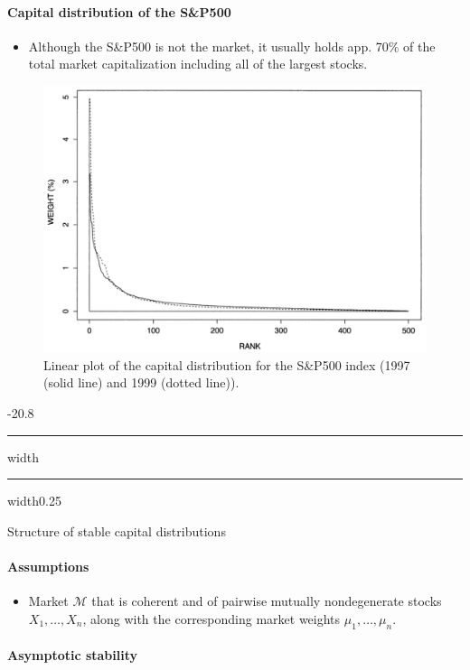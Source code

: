 \documentclass[a4paper,landscape,8pt,fleqn]{scrartcl}
\makeatletter
\renewcommand{\subsection}{\@startsection{subsection}{1}{0mm}%
{-2\baselineskip}{0.8\baselineskip}%
{\hrule depth 0.2pt width\columnwidth\hrule depth0.75pt
width0.25\columnwidth\vspace*{1.2em}\large\bfseries}}
\makeatother
\begin{document}
\begin{multicols*}{3}
\paragraph{Capital distribution of the S\&P500}

\begin{itemize}
\item Although the S\&P500 is not the market, it usually holds app. 70\% of the total market capitalization including all of the largest stocks.
\end{itemize}

\begin{figure}[H]
\centering
\includegraphics[width=0.8 \linewidth]{CapitalDistributionSPX}
\caption{Linear plot of the capital distribution for the S\&P500 index (1997 (solid line) and 1999 (dotted line)).}
\label{fig:CapDistrLinear}
\end{figure}

\subsection{Structure of stable capital distributions}

\paragraph{Assumptions}

\begin{itemize}
\item Market $\mathcal{M}$ that is coherent and of pairwise mutually nondegenerate stocks $X_1, \ldots, X_n$, along with the corresponding market weights $\mu_1, \ldots, \mu_n$.
\end{itemize}

\paragraph{Asymptotic stability}


\end{multicols*}
\end{document}
